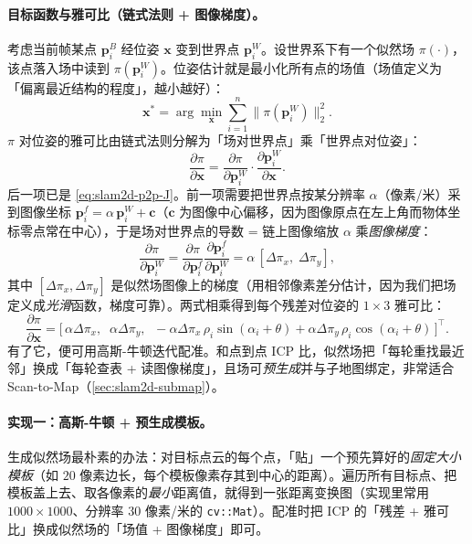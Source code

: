 \paragraph{目标函数与雅可比（链式法则 + 图像梯度）。}
考虑当前帧某点 $\mathbf{p}_i^B$ 经位姿 $\mathbf{x}$ 变到世界点 $\mathbf{p}_i^W$。设世界系下有一个似然场 $\pi(\cdot)$，该点落入场中读到 $\pi(\mathbf{p}_i^W)$。位姿估计就是最小化所有点的场值（场值定义为「偏离最近结构的程度」，越小越好）：
\begin{equation}
\mathbf{x}^*=\arg\min_{\mathbf{x}}\sum_{i=1}^n\big\|\pi(\mathbf{p}_i^W)\big\|_2^2.
\label{eq:slam2d-lf-obj}
\end{equation}
$\pi$ 对位姿的雅可比由链式法则分解为「场对世界点」乘「世界点对位姿」：
\begin{equation}
\frac{\partial\pi}{\partial\mathbf{x}}=\frac{\partial\pi}{\partial\mathbf{p}_i^W}\cdot\frac{\partial\mathbf{p}_i^W}{\partial\mathbf{x}}.
\label{eq:slam2d-lf-chain}
\end{equation}
后一项已是 \cref{eq:slam2d-p2p-J}。前一项需要把世界点按某分辨率 $\alpha$（像素/米）采到图像坐标 $\mathbf{p}_i^f=\alpha\,\mathbf{p}_i^W+\mathbf{c}$（$\mathbf{c}$ 为图像中心偏移，因为图像原点在左上角而物体坐标零点常在中心），于是场对世界点的导数 = 链上图像缩放 $\alpha$ 乘\emph{图像梯度}：
\begin{equation}
\frac{\partial\pi}{\partial\mathbf{p}_i^W}=\frac{\partial\pi}{\partial\mathbf{p}_i^f}\frac{\partial\mathbf{p}_i^f}{\partial\mathbf{p}_i^W}=\alpha\,[\Delta\pi_x,\;\Delta\pi_y],
\label{eq:slam2d-lf-grad}
\end{equation}
其中 $[\Delta\pi_x,\Delta\pi_y]$ 是似然场图像上的梯度（用相邻像素差分估计，因为我们把场定义成\emph{光滑}函数，梯度可靠）。两式相乘得到每个残差对位姿的 $1\times 3$ 雅可比：
\begin{equation}
\frac{\partial\pi}{\partial\mathbf{x}}=\big[\,\alpha\Delta\pi_x,\;\;\alpha\Delta\pi_y,\;\; -\alpha\Delta\pi_x\,\rho_i\sin(\alpha_i+\theta)+\alpha\Delta\pi_y\,\rho_i\cos(\alpha_i+\theta)\,\big]^\top.
\label{eq:slam2d-lf-J}
\end{equation}
有了它，便可用高斯-牛顿迭代配准。和点到点 ICP 比，似然场把「每轮重找最近邻」换成「每轮查表 + 读图像梯度」，且场可\emph{预生成}并与子地图绑定，非常适合 Scan-to-Map（\cref{sec:slam2d-submap}）。

\paragraph{实现一：高斯-牛顿 + 预生成模板。}
生成似然场最朴素的办法：对目标点云的每个点，「贴」一个预先算好的\emph{固定大小模板}（如 $20$ 像素边长，每个模板像素存其到中心的距离）。遍历所有目标点、把模板盖上去、取各像素的\emph{最小}距离值，就得到一张距离变换图（实现里常用 $1000\times 1000$、分辨率 $30$ 像素/米的 \texttt{cv::Mat}）。配准时把 ICP 的「残差 + 雅可比」换成似然场的「场值 + 图像梯度」即可。

